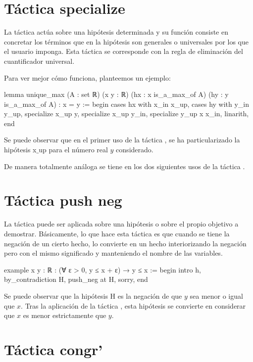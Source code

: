 \section{Táctica specialize}

La táctica  actúa sobre una hipótesis
determinada y su función consiste en concretar los términos que en la
hipótesis son generales o universales por los que el usuario
imponga. Esta táctica se corresponde con la regla de eliminación del
cuantificador universal.

Para ver mejor cómo funciona, planteemos un ejemplo:
\begin{leancode}
lemma unique_max
  (A : set ℝ)
  (x y : ℝ)
  (hx : x is_a_max_of A)
  (hy : y is_a_max_of A) :
  x = y :=
begin
  cases hx with x_in x_up,
  cases hy with y_in y_up,
  specialize x_up y,
  specialize x_up y_in,
  specialize y_up x x_in,
  linarith,
end
\end{leancode}

Se puede observar que en el primer uso de la táctica
, se ha particularizado la hipótesis
x\(\_\)up para el número real \(y\) considerado.

De manera totalmente análoga se tiene en los dos siguientes usos de la
táctica .

\section{Táctica push neg}

La táctica  puede ser aplicada sobre una
hipótesis o sobre el propio objetivo a demostrar. Básicamente, lo que
hace esta táctica es que cuando se tiene la negación de un cierto hecho,
lo convierte en un hecho interiorizando la negación pero con el mismo
significado y manteniendo el nombre de las variables.

\begin{leancode}
example {x y : ℝ} : (∀ ε > 0, y ≤ x + ε) →  y ≤ x :=
begin
  intro h,
  by_contradiction H,
  push_neg at H,
  sorry,
end
\end{leancode}

Se puede observar que la hipótesis H es la negación de que \(y\) sea
menor o igual que \(x\). Tras la aplicación de la táctica
, esta hipótesis se convierte en
considerar que \(x\) es menor estrictamente que \(y\).

\section{Táctica congr'}

